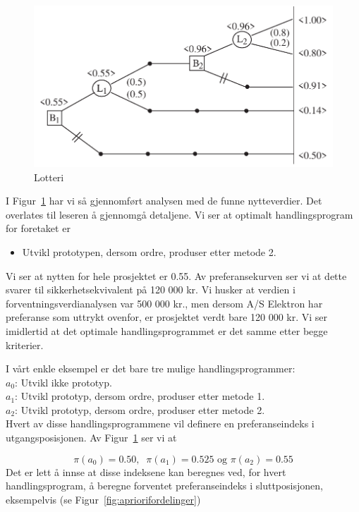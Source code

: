 {{\begin{figure}[ht]
\centering
 \includegraphics[scale=0.8]{figurer/fig16_20.pdf} 
\caption{Lotteri}
	\label{fig:lotteri5}
\end{figure}

I Figur~\ref{fig:lotteri5} har vi så gjennomført analysen med de funne nytteverdier.
Det overlates til leseren å gjennomgå 
detaljene.  Vi ser at optimalt hand\-lingsprogram for foretaket er 

\begin{itemize}
\item Utvikl prototypen, dersom ordre, produser etter metode 2.
\end{itemize}
Vi ser at nytten for hele prosjektet er 0.55.  Av 
preferansekurven ser vi at dette svarer til sikkerhetsekvivalent på
120 000 kr.  Vi husker at verdien i forventningsverdianalysen var 
500 000 kr., men dersom A/S Elektron har preferanse som uttrykt ovenfor, er
prosjektet verdt bare 120 000 kr.  Vi ser imidlertid at det optimale
handlingsprogrammet er det samme etter begge kriterier.


I vårt enkle eksempel er det bare tre mulige handlingsprogrammer:\\[1mm]
$a_0$: Utvikl ikke prototyp.\\
$a_1$: Utvikl prototyp, dersom ordre, produser etter metode 1.\\
$a_2$: Utvikl prototyp, dersom ordre, produser etter metode 2.\\[1mm]
Hvert av disse handlingsprogrammene vil definere en preferanseindeks i
utgangsposisjonen.  Av Figur~\ref{fig:lotteri5} ser vi at

\[ \pi (a_0)=0.50,\;\;\pi (a_1)=0.525 \mbox{\ \ \ og \ \  }\pi (a_2)=0.55 \]
Det er lett å innse at disse indeksene kan beregnes ved, for hvert 
hand\-lings\-program, å beregne forventet preferanseindeks i 
sluttposisjonen, eksempelvis (se Figur~\ref{fig:apriorifordelinger})

}}
